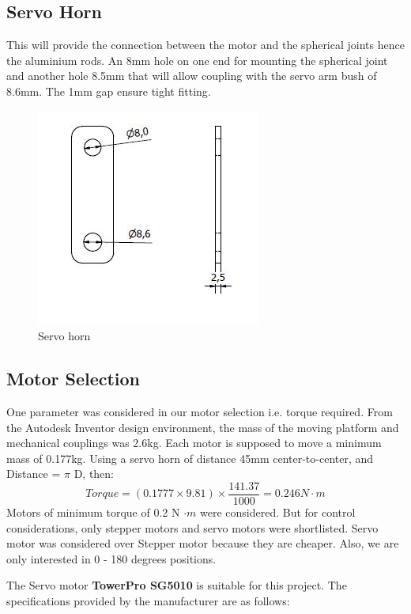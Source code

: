 \subsection{Servo Horn}
This will provide the connection between the motor and the spherical joints hence the aluminium rods. An 8mm hole on one end for mounting the spherical joint and another hole 8.5mm that will allow coupling with the servo arm bush of 8.6mm. The 1mm gap ensure tight fitting.
\begin{center}
	\begin{figure}[!h]
	\centering
	\includegraphics[width=0.6\linewidth]{Figures/Horn}
	\caption{Servo horn}
	\end{figure}
\end{center}

\subsection{Motor Selection}
One parameter was considered in our motor selection i.e. torque required. From the Autodesk Inventor design environment, the mass of the moving platform and mechanical couplings was 2.6kg. Each motor is supposed to move a minimum mass of 0.177kg. Using a servo horn of distance 45mm center-to-center, and Distance = $ \pi $ D, then:
\begin{equation}
Torque = (0.1777 \times 9.81)\times \frac{141.37}{1000} = 0.246 N\cdot m
\end{equation}
Motors of minimum torque of 0.2 N $\cdot m$ were considered. But for control considerations, only stepper motors and servo motors were shortlisted. Servo motor was considered over Stepper motor because they are cheaper. Also, we are only interested in 0 - 180 degrees positions.

The Servo motor \textbf{TowerPro SG5010} is suitable for this project. The specifications provided by the manufacturer are as follows:

